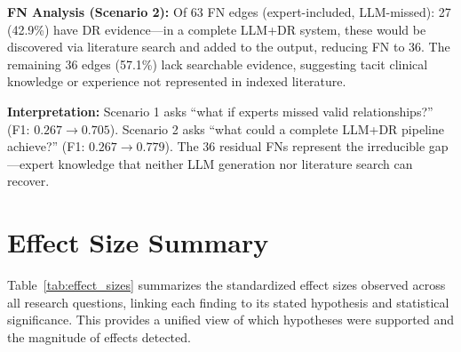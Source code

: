 \textbf{FN Analysis (Scenario 2):} Of 63 FN edges (expert-included, LLM-missed): 27 (42.9\%) have DR evidence---in a complete LLM+DR system, these would be discovered via literature search and added to the output, reducing FN to 36. The remaining 36 edges (57.1\%) lack searchable evidence, suggesting tacit clinical knowledge or experience not represented in indexed literature.

\textbf{Interpretation:} Scenario 1 asks ``what if experts missed valid relationships?'' (F1: $0.267 \to 0.705$). Scenario 2 asks ``what could a complete LLM+DR pipeline achieve?'' (F1: $0.267 \to 0.779$). The 36 residual FNs represent the irreducible gap---expert knowledge that neither LLM generation nor literature search can recover.

\begin{center}
\end{center}

\section{Effect Size Summary}

Table~\ref{tab:effect_sizes} summarizes the standardized effect sizes observed across all research questions, linking each finding to its stated hypothesis and statistical significance. This provides a unified view of which hypotheses were supported and the magnitude of effects detected.

